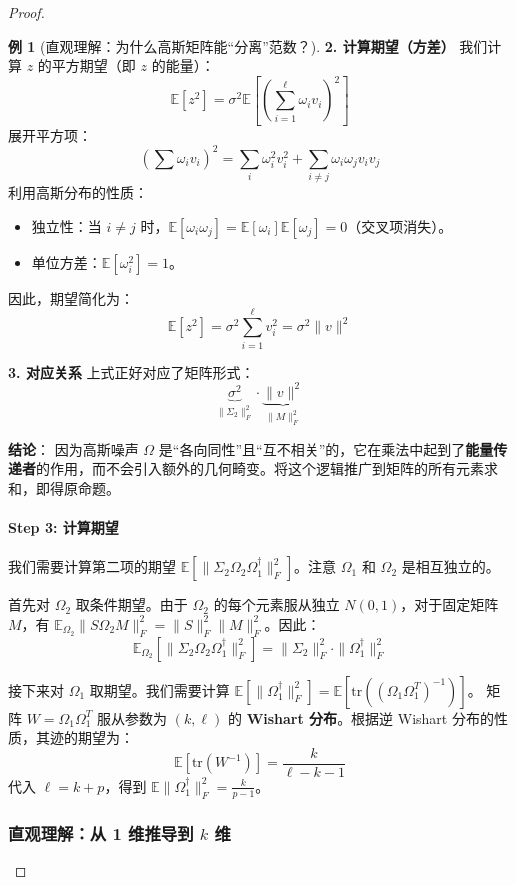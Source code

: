 \documentclass[11pt,a4paper]{ctexart}
\theoremstyle{definition}
\newtheorem{example}[theorem]{例}
\theoremstyle{remark}
\begin{document}
\begin{proof}
\begin{example}[直观理解：为什么高斯矩阵能“分离”范数？]
    \textbf{2. 计算期望（方差）}
    我们计算 $z$ 的平方期望（即 $z$ 的能量）：
    \[
    \mathbb{E}[z^2] = \sigma^2 \mathbb{E} \left[ \left( \sum_{i=1}^\ell \omega_i v_i \right)^2 \right]
    \]
    展开平方项：
    \[
    \left( \sum \omega_i v_i \right)^2 = \sum_{i} \omega_i^2 v_i^2 + \sum_{i \neq j} \omega_i \omega_j v_i v_j
    \]
    利用高斯分布的性质：
    \begin{itemize}
        \item 独立性：当 $i \neq j$ 时，$\mathbb{E}[\omega_i \omega_j] = \mathbb{E}[\omega_i]\mathbb{E}[\omega_j] = 0$（交叉项消失）。
        \item 单位方差：$\mathbb{E}[\omega_i^2] = 1$。
    \end{itemize}
    因此，期望简化为：
    \[
    \mathbb{E}[z^2] = \sigma^2 \sum_{i=1}^\ell v_i^2 = \sigma^2 \|v\|^2
    \]
    
    \textbf{3. 对应关系}
    上式正好对应了矩阵形式：
    \[
    \underbrace{\sigma^2}_{\| \Sigma_2 \|_F^2} \cdot \underbrace{\|v\|^2}_{\| M \|_F^2}
    \]
    
    \textbf{结论}：
    因为高斯噪声 $\Omega$ 是“各向同性”且“互不相关”的，它在乘法中起到了\textbf{能量传递者}的作用，而不会引入额外的几何畸变。将这个逻辑推广到矩阵的所有元素求和，即得原命题。
\end{example}

\paragraph{Step 3: 计算期望}
我们需要计算第二项的期望 $\mathbb{E} [ \| \Sigma_2 \Omega_2 \Omega_1^\dagger \|_F^2 ]$。注意 $\Omega_1$ 和 $\Omega_2$ 是相互独立的。

首先对 $\Omega_2$ 取条件期望。由于 $\Omega_2$ 的每个元素服从独立 $N(0,1)$，对于固定矩阵 $M$，有 $\mathbb{E}_{\Omega_2} \| S \Omega_2 M \|_F^2 = \| S \|_F^2 \| M \|_F^2$。因此：
\[
\mathbb{E}_{\Omega_2} [ \| \Sigma_2 \Omega_2 \Omega_1^\dagger \|_F^2 ] = \| \Sigma_2 \|_F^2 \cdot \| \Omega_1^\dagger \|_F^2
\]

接下来对 $\Omega_1$ 取期望。我们需要计算 $\mathbb{E} [ \| \Omega_1^\dagger \|_F^2 ] = \mathbb{E} [ \text{tr}( (\Omega_1 \Omega_1^T)^{-1} ) ]$。
矩阵 $W = \Omega_1 \Omega_1^T$ 服从参数为 $(k, \ell)$ 的 \textbf{Wishart 分布}。根据逆 Wishart 分布的性质，其迹的期望为：
\[
\mathbb{E} [ \text{tr}(W^{-1}) ] = \frac{k}{\ell - k - 1}
\]
代入 $\ell = k+p$，得到 $\mathbb{E} \| \Omega_1^\dagger \|_F^2 = \frac{k}{p-1}$。

\subsubsection*{直观理解：从 1 维推导到 $k$ 维}


\end{proof}
\end{document}
